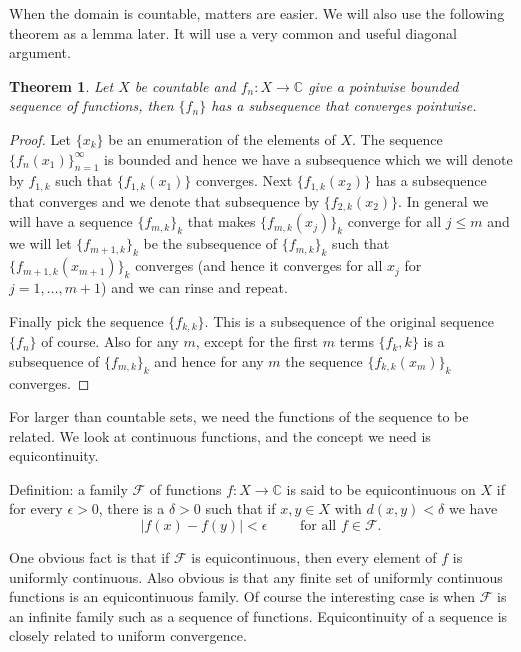 \documentclass[12pt]{book}
\newcommand{\abs}[1]{\left\lvert {#1} \right\rvert}
\newcommand{\C}{{\mathbb{C}}}
\newcommand{\sF}{{\mathcal{F}}}
\theoremstyle{plain}
\newtheorem{thm}{Theorem}[section]
\theoremstyle{remark}
\theoremstyle{definition}
\theoremstyle{exercise}
\theoremstyle{example}
\begin{document}
When the domain is countable, matters are easier.  We will also use the
following theorem as a lemma later.  It will use a very common and useful
diagonal argument.

\begin{thm}
Let $X$ be countable and $f_n \colon X \to \C$ give a pointwise bounded
sequence of functions, then $\{ f_n \}$ has a subsequence that converges
pointwise.
\end{thm}

\begin{proof}
Let $\{ x_k \}$ be an enumeration of the elements of $X$.
The sequence $\{ f_n(x_1) \}_{n=1}^\infty$ is bounded and hence
we have a subsequence which we will denote by
$f_{1,k}$ such that $\{ f_{1,k}(x_1) \}$ converges.
Next $\{ f_{1,k}(x_2) \}$ has a subsequence that converges and
we denote that subsequence by
$\{ f_{2,k}(x_2) \}$.  In general we will have a sequence $\{ f_{m,k} \}_k$
that makes $\{ f_{m,k}(x_j) \}_k$ converge for all $j \leq m$ and we will
let $\{ f_{m+1,k} \}_k$ be the subsequence of $\{ f_{m,k} \}_k$
such that
$\{ f_{m+1,k}(x_{m+1}) \}_k$ converges (and hence it converges for all
$x_j$ for $j=1,\ldots,m+1$) and we can rinse and repeat.

Finally pick the sequence
$\{ f_{k,k} \}$.  This is a subsequence of the original sequence $\{ f_n \}$
of course.  Also for any $m$,
except for the first $m$ terms $\{ f_k,k \}$ is a subsequence of $\{ f_{m,k} \}_k$
and hence for any $m$ the sequence $\{ f_{k,k}(x_m) \}_k$ converges.
\end{proof}

\medskip

For larger than countable sets,
we need the functions of the sequence to be related.  We look at
continuous functions, and the concept we need is equicontinuity.

Definition: a family $\sF$ of functions $f \colon X \to \C$ is said to be
equicontinuous on $X$ if for every $\epsilon > 0$, there is a $\delta > 0$
such that if $x, y \in X$ with $d(x,y) < \delta$ we have
$$
\abs{f(x)-f(y)} < \epsilon \qquad \text{ for all $f \in \sF$} .
$$

One obvious fact is that if $\sF$ is equicontinuous, then every element of
$f$ is uniformly continuous.  Also obvious is that any finite set of
uniformly continuous functions is an equicontinuous family.  Of course the
interesting case is when $\sF$ is an infinite family such as a sequence of
functions.  Equicontinuity of a sequence
is closely related to uniform convergence.
\end{document}
